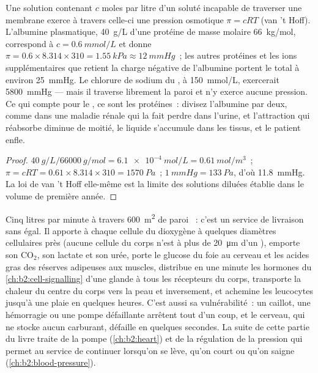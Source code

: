 \begin{theorem}\label{thm:b2:blood-circulation:oncotic}
Une solution contenant $c$ moles par litre d'un soluté incapable de
traverser une membrane exerce à travers celle-ci une pression osmotique
$\pi = cRT$ (van 't Hoff). L'albumine plasmatique, \qty{40}{g/L} d'une
protéine de masse molaire \qty{66}{kg/mol}, correspond à
$c = \qty{0.6}{mmol/L}$ et donne $\pi =
0.6\times 8.314\times 310 = \qty{1.55}{kPa} \approx \qty{12}{mmHg}$~;
les autres protéines et les ions supplémentaires que retient la charge
négative de l'albumine portent le total à environ \qty{25}{mmHg}. Le
chlorure de sodium du , à \qty{150}{mmol/L}, exercerait
\qty{5800}{mmHg} --- mais il traverse librement la paroi  et
n'y exerce aucune pression. Ce qui compte pour le , ce sont
les protéines~: divisez l'albumine par deux, comme dans une maladie
rénale qui la fait perdre dans l'urine, et l'attraction qui réabsorbe
diminue de moitié, le liquide s'accumule dans les tissus, et le patient
enfle.
\end{theorem}
\begin{proof}
$\qty{40}{g/L}/\qty{66000}{g/mol} = \qty{6.1e-4}{mol/L} =
\qty{0.61}{mol/m^3}$~; $\pi = cRT = 0.61\times 8.314\times 310 =
\qty{1570}{Pa}$~; $\qty{1}{mmHg} = \qty{133}{Pa}$, d'où \qty{11.8}{mmHg}.
La loi de van 't Hoff elle-même est la limite des solutions diluées
établie dans le volume de première année.
\end{proof}

\begin{example}\label{ex:b2:blood-circulation:transport}
Cinq litres par minute à travers \qty{600}{m^2} de paroi ~:
c'est un service de livraison sans égal. Il apporte à chaque cellule du
dioxygène à quelques diamètres cellulaires près (aucune cellule du corps
n'est à plus de \qty{20}{\micro m} d'un ), emporte son
$\mathrm{CO_2}$, son lactate et son urée, porte le glucose du foie au
cerveau et les acides gras des réserves adipeuses aux muscles, distribue
en une minute les hormones du \cref{ch:b2:cell-signalling} d'une glande
à tous les récepteurs du corps, transporte la chaleur du centre du corps
vers la peau et inversement, et achemine les leucocytes jusqu'à une
plaie en quelques heures. C'est aussi sa vulnérabilité~: un caillot, une
hémorragie ou une pompe défaillante arrêtent tout d'un coup, et le
cerveau, qui ne stocke aucun carburant, défaille en quelques secondes.
La suite de cette partie du livre traite de la pompe
(\cref{ch:b2:heart}) et de la régulation de la pression qui permet au
service de continuer lorsqu'on se lève, qu'on court ou qu'on saigne
(\cref{ch:b2:blood-pressure}).
\end{example}


